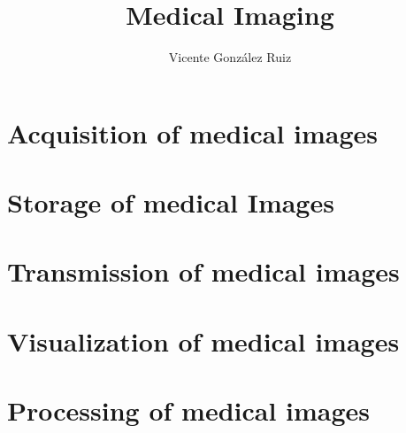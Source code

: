 \documentclass{report}
\title{Medical Imaging}
\author{Vicente González Ruiz}
\begin{document}
\maketitle
\tableofcontents
\listoffigures
\listoftables

\part{Acquisition of medical images}









\part{Storage of medical Images}








%

\part{Transmission of medical images}



%

\part{Visualization of medical images}


%

\part{Processing of medical images}





%

\printglossary[type=\acronymtype]





\end{document}
